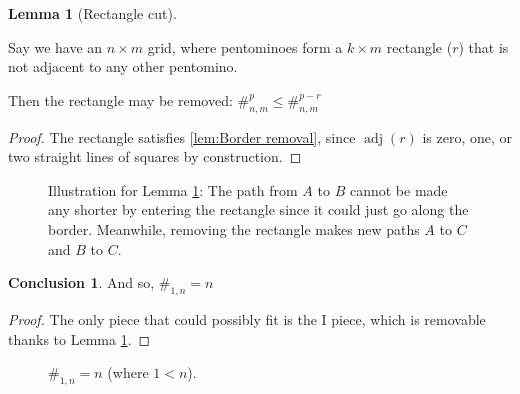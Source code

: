 \documentclass{article}
\theoremstyle{definition}%
\newtheorem{lemma}[theorem]{Lemma}
\newtheorem*{conclusion}{Conclusion}
\newcommand{\adj}{\operatorname{adj}}
\begin{document}
\begin{lemma}[Rectangle cut]
\label{lem:Rectangle cut}

Say we have an $n \times m$ grid, where pentominoes form a $k \times m$ rectangle ($r$) that is not adjacent to any other pentomino.

Then the rectangle may be removed: $\#^{p}_{n, m} \le \#^{p - r}_{n, m}$
\end{lemma}

\begin{proof}
The rectangle satisfies \ref{lem:Border removal}, since $\adj(r)$ is zero, one, or two straight lines of squares by construction.
\end{proof}

\begin{figure}[htbp]
    \centering
    \caption{Illustration for Lemma \ref{lem:Rectangle cut}: The path from $A$ to $B$ cannot be made any shorter by entering the rectangle since it could just go along the border. Meanwhile, removing the rectangle makes new paths $A$ to $C$ and $B$ to $C$.}
\end{figure}

\begin{conclusion}
And so, $\#_{1, n} = n$
\end{conclusion}

\begin{proof}
The only piece that could possibly fit is the I piece, which is removable thanks to Lemma \ref{lem:Rectangle cut}.
\end{proof}

\begin{figure}[htbp]
    \centering
    \caption{$\#_{1, n} = n$ (where $1 < n$). \cite{sheet}}
\end{figure}
\end{document}

